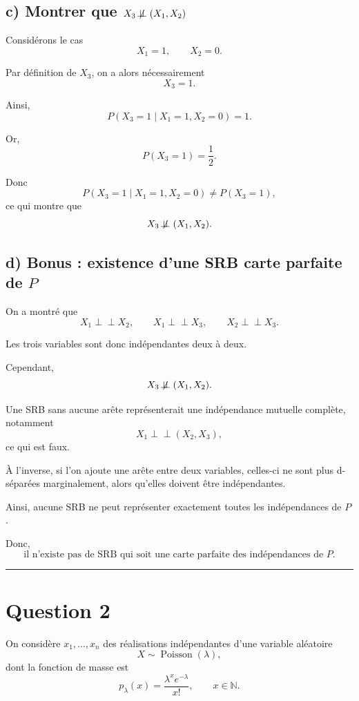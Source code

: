 \documentclass{article}
\begin{document}
\subsection*{c) Montrer que $X_3 \not\!\perp\!\!\!\perp (X_1,X_2)$}

Considérons le cas
\[
X_1=1,
\qquad
X_2=0.
\]

Par définition de $X_3$, on a alors nécessairement
\[
X_3=1.
\]

Ainsi,
\[
P(X_3=1\mid X_1=1,X_2=0)=1.
\]

Or,
\[
P(X_3=1)=\frac12.
\]

Donc
\[
P(X_3=1\mid X_1=1,X_2=0)
\neq
P(X_3=1),
\]
ce qui montre que
\[
X_3 \not\!\perp\!\!\!\perp (X_1,X_2).
\]

\subsection*{d) Bonus : existence d'une SRB carte parfaite de $P$}

On a montré que
\[
X_1 \perp\!\!\!\perp X_2,
\qquad
X_1 \perp\!\!\!\perp X_3,
\qquad
X_2 \perp\!\!\!\perp X_3.
\]

Les trois variables sont donc indépendantes deux à deux.

Cependant,
\[
X_3 \not\!\perp\!\!\!\perp (X_1,X_2).
\]

Une SRB sans aucune arête représenterait une indépendance mutuelle complète, notamment
\[
X_1 \perp\!\!\!\perp (X_2,X_3),
\]
ce qui est faux.

À l'inverse, si l'on ajoute une arête entre deux variables, celles-ci ne sont plus d-séparées marginalement, alors qu'elles doivent être indépendantes.

Ainsi, aucune SRB ne peut représenter exactement toutes les indépendances de $P$.

Donc,
\[
\text{il n'existe pas de SRB qui soit une carte parfaite des indépendances de }P.
\]

\vspace{1cm}
\hrule
\vspace{1cm}

\section*{Question 2}

On considère $x_1,\ldots,x_n$ des réalisations indépendantes d'une variable aléatoire
\[
X \sim \operatorname{Poisson}(\lambda),
\]
dont la fonction de masse est
\[
p_\lambda(x)
=
\frac{\lambda^x e^{-\lambda}}{x!},
\qquad x\in\mathbb{N}.
\]
\end{document}
